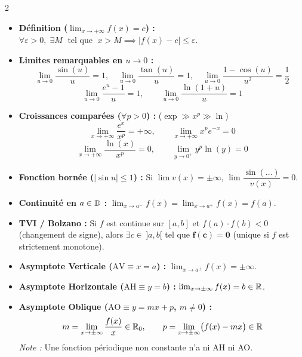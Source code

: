 {\begin{multicols}{2}
\begin{itemize}[leftmargin=1.2em, itemsep=2pt, topsep=2pt]
    \item \textbf{Définition ($\lim_{x \to +\infty} f(x) = c$) :}\\
    $\forall \varepsilon > 0, \;\exists M \;\text{ tel que }\; x > M \implies |f(x) - c| \le \varepsilon$.
    \item \textbf{Limites remarquables en $u \to 0$ :}
    \[
        \lim_{u \to 0} \frac{\sin(u)}{u} = 1, \quad \lim_{u \to 0} \frac{\tan(u)}{u} = 1, \quad \lim_{u \to 0} \frac{1 - \cos(u)}{u^2} = \frac{1}{2}
    \]
    \[
        \lim_{u \to 0} \frac{e^u - 1}{u} = 1, \qquad \lim_{u \to 0} \frac{\ln(1+u)}{u} = 1
    \]
    \item \textbf{Croissances comparées ($\forall p > 0$) :} ($\exp \gg x^p \gg \ln$)
    \[
        \lim_{x \to +\infty} \frac{e^x}{x^p} = +\infty, \qquad \lim_{x \to +\infty} x^p e^{-x} = 0
    \]
    \[
        \lim_{x \to +\infty} \frac{\ln(x)}{x^p} = 0, \qquad \lim_{y \to 0^+} y^p \ln(y) = 0
    \]
    \item \textbf{Fonction bornée ($|\sin u| \le 1$) :} Si $\lim v(x) = \pm\infty$, $\lim \dfrac{\sin(\dots)}{v(x)} = 0$.
\end{itemize}

\vspace{3pt}
\begin{itemize}[leftmargin=1.2em, itemsep=1.5pt, topsep=2pt]
    \item \textbf{Continuité en $a \in \mathbb{D}$ :} $\lim_{x \to a^-} f(x) = \lim_{x \to a^+} f(x) = f(a)$.
    \item \textbf{TVI / Bolzano :} Si $f$ est continue sur $[a, b]$ et $f(a)\cdot f(b) < 0$ (changement de signe), alors $\exists c \in \,]a, b[$ tel que $\mathbf{f(c) = 0}$ (unique si $f$ est strictement monotone).
\end{itemize}

\vspace{3pt}
\begin{itemize}[leftmargin=1.2em, itemsep=1.5pt, topsep=2pt]
    \item \textbf{Asymptote Verticale ($\text{AV} \equiv x = a$) :} $\lim_{x \to a^\pm} f(x) = \pm\infty$.
    \item \textbf{Asymptote Horizontale ($\text{AH} \equiv y = b$) :} $\lim_{x \to \pm\infty} f(x) = b \in \mathbb{R}$.
    \item \textbf{Asymptote Oblique ($\text{AO} \equiv y = mx + p$, $m \neq 0$) :}
    \[
        m = \lim_{x \to \pm\infty} \frac{f(x)}{x} \in \mathbb{R}_0, \qquad p = \lim_{x \to \pm\infty} \bigl(f(x) - mx\bigr) \in \mathbb{R}
    \]
    \emph{Note :} Une fonction périodique non constante n'a ni AH ni AO.
\end{itemize}

\end{multicols}
}


